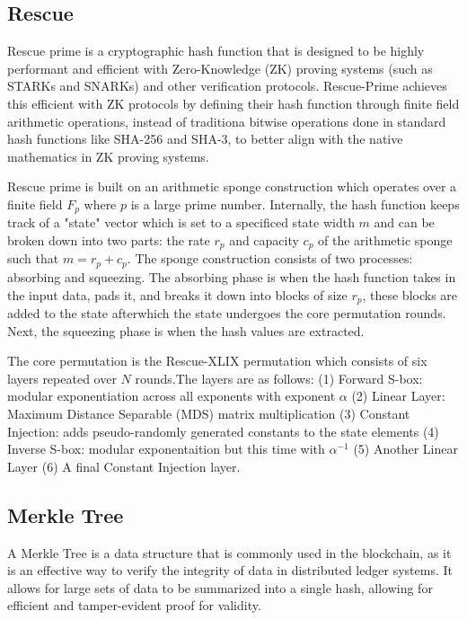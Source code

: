 \documentclass[conference]{IEEEtran}
\begin{document}
\subsection{Rescue}
Rescue prime is a cryptographic hash function that is designed to be highly performant and efficient with Zero-Knowledge (ZK) proving systems (such as STARKs and SNARKs) and other verification protocols. Rescue-Prime achieves this efficient with ZK protocols by defining their hash function through finite field arithmetic operations, instead of traditiona bitwise operations done in standard hash functions like SHA-256 and SHA-3, to better align with the native mathematics in ZK proving systems.

Rescue prime is built on an arithmetic sponge construction which operates over a finite field $F_p$ where $p$ is a large prime number. Internally, the hash function keeps track of a "state" vector which is set to a specificed state width $m$ and can be broken down into two parts: the rate $r_p$ and capacity $c_p$ of the arithmetic sponge such that $m=r_p+c_p$. The sponge construction consists of two processes: absorbing and squeezing. The absorbing phase is when the hash function takes in the input data, pads it, and breaks it down into blocks of size $r_p$, these blocks are added to the state afterwhich the state undergoes the core permutation rounds. Next, the squeezing phase is when the hash values are extracted.

The core permutation is the Rescue-XLIX permutation which consists of six layers repeated over $N$ rounds.The layers are as follows: (1) Forward S-box: modular exponentiation across all exponents with exponent $\alpha$ (2) Linear Layer: Maximum Distance Separable (MDS) matrix multiplication (3) Constant Injection: adds pseudo-randomly generated constants to the state elements (4) Inverse S-box: modular exponentaition but this time with $\alpha^{-1}$ (5) Another Linear Layer (6) A final Constant Injection layer.

\subsection{Merkle Tree}

A Merkle Tree is a data structure that is commonly used in the blockchain, as it is an effective way to verify the integrity of data in distributed ledger systems. It allows for large sets of data to be summarized into a single hash, allowing for efficient and tamper-evident proof for validity.
\end{document}
